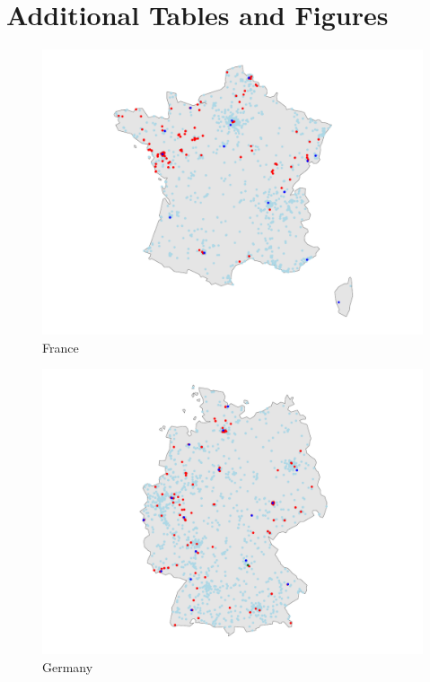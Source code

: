 \documentclass[12pt]{report}
\begin{document}
\newpage
\appendix
\chapter{Additional Tables and Figures}

\begin{figure}[ht]
    \centering
    \includegraphics[width=0.62\textheight,trim={2cm 0cm 2cm 0cm},clip]{../Output/FR_map.pdf}
    \caption{France}
    \label{fig:map_obs_FR}
\end{figure}

\newpage
\begin{figure}[ht]
    \centering
    \includegraphics[width=.9\textheight,trim={3cm 0cm 2.5cm 0.5cm},clip]{../Output/DE_map.pdf}
    \caption{Germany}
    \label{fig:map_obs_DE}
\end{figure}
\end{document}
